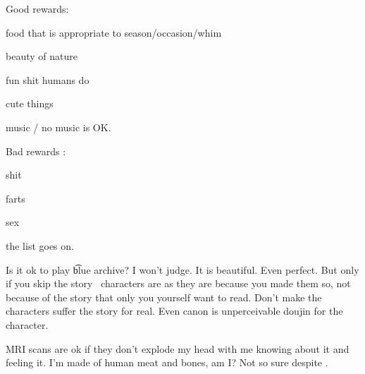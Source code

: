 Good rewards: \startperec
  \item food that is appropriate to season/occasion/whim
  \item beauty of nature 
  \item fun shit humans do
  \item cute things
  \item music / no music is OK.
  \stopperec

Bad rewards : \startperec
  \item shit
  \item farts
  \item sex
  \item the list goes on.
  \stopperec

Is it ok to play \t{blue archive}? I won't judge. It is beautiful. Even perfect. But only if you skip the story \emdash\ characters are as they are because you made them so, not because of the story that only you yourself want to read. Don't make the characters suffer the story for real. Even canon is unperceivable doujin for the character.

MRI scans are ok if they don't explode my head with me knowing about it and feeling it. I'm made of human meat and bones, am I? Not so sure despite .
